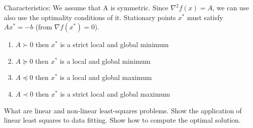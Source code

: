 \documentclass[12pt,a4paper]{article}
\begin{document}
Characteristics: 
We assume that A is symmetric. Since $\nabla^2 f(x) = A$, we can use also use the optimality conditions of it. Stationary points $x^*$ must satisfy $Ax^*=-b$ (from $\nabla f(x^*) = 0$).
\begin{enumerate}
    \item $A \succ 0$ then $x^*$ is a strict local and global minimum
    \item $A \succeq 0$ then $x^*$ is a local and global minimum
    \item $A \preceq 0$ then $x^*$ is a local and global maximum
    \item $A \prec 0$ then $x^*$ is a strict local and global maximum
\end{enumerate}
%
\begin{question}
What are linear and non-linear least-squares problems. Show the application of linear least squares to data fitting. Show how to compute the optimal solution.
\end{question}
\end{document}
